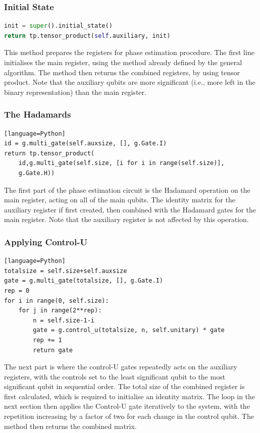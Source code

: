 \documentclass{article}
\begin{document}
\subsubsection{Initial State}
\begin{file}
\begin{lstlisting}[language=Python]
init = super().initial_state()
return tp.tensor_product(self.auxiliary, init)
\end{lstlisting}
\end{file}

This method prepares the registers for phase estimation procedure. The first line initialises the main register, using the method already defined by the general algorithm. The method then returns the combined registers, by using tensor product. Note that the auxiliary qubits are more significant (i.e., more left in the binary representation) than the main register.
\pagebreak
\subsubsection{The Hadamards}
\begin{center}
\begin{file}
\begin{lstlisting}[linewidth=14cm][language=Python]
id = g.multi_gate(self.auxsize, [], g.Gate.I)
return tp.tensor_product(
    id,g.multi_gate(self.size, [i for i in range(self.size)],
    g.Gate.H))
\end{lstlisting}
\end{file}
\end{center}

The first part of the phase estimation circuit is the Hadamard operation on the main register, acting on all of the main qubits. The identity matrix for the auxiliary register if first created, then combined with the Hadamard gates for the main register. Note that the auxiliary register is not affected by this operation. 

\subsubsection{Applying Control-U}
\begin{file}
\begin{lstlisting}[linewidth=14cm][language=Python]
totalsize = self.size+self.auxsize
gate = g.multi_gate(totalsize, [], g.Gate.I)
rep = 0
for i in range(0, self.size):
    for j in range(2**rep):
        n = self.size-1-i
        gate = g.control_u(totalsize, n, self.unitary) * gate
        rep += 1
        return gate
\end{lstlisting}
\end{file}
The next part is where the control-U gates repeatedly acts on the auxiliary registers, with the controls set to the least significant qubit to the most significant qubit in sequential order. The total size of the combined register is first calculated, which is required to initialise an identity matrix. The loop in the next section then applies the Control-U gate iteratively to the system, with the repetition increasing by a factor of two for each change in the control qubit. The method then returns the combined matrix.
\pagebreak
\end{document}
